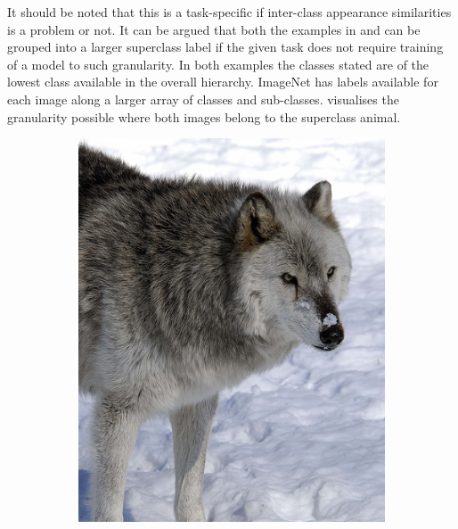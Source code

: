 It should be noted that this is a task-specific if inter-class appearance similarities is a problem or not. It can be argued that both the examples in  and  can be grouped into a larger superclass label if the given task does not require training of a model to such granularity. In both examples the classes stated are of the lowest class available in the overall hierarchy. ImageNet has labels available for each image along a larger array of classes and sub-classes.  visualises the granularity possible where both images belong to the superclass animal.

\begin{figure}[H]
    \centering
    \begin{subfigure}[b]{0.25\textwidth}
        \center
        \includegraphics[width=\textwidth]{Figs/Problem/wolf.jpeg}
        \caption{}\label{fig:interhier1a}
    \end{subfigure}
    \begin{subfigure}[b]{0.20\textwidth}
        \center

\end{subfigure}
\end{figure}
